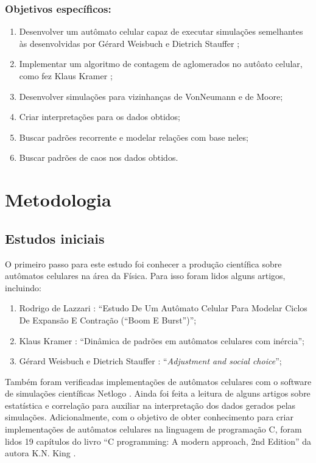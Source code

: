 \documentclass[
	12pt,				%
	openright,			%
	twoside,			%
	a4paper,			%
	english,			%
	french,				%
	spanish,			%
	brazil				%
	]{abntex2}
\begin{document}
\subsection*{Objetivos específicos:}
\begin{enumerate}
  \item Desenvolver um autômato celular capaz de executar simulações semelhantes às desenvolvidas por Gérard Weisbuch e Dietrich Stauffer \cite{stauffer};
  \item Implementar um algoritmo de contagem de aglomerados no autôato celular, como fez Klaus Kramer \cite{klaus};
  \item Desenvolver simulações para vizinhanças de VonNeumann e de Moore;
  \item Criar interpretações para os dados obtidos;
  \item Buscar padrões recorrente e modelar relações com base neles;
  \item Buscar padrões de caos nos dados obtidos.
\end{enumerate}


\chapter{Metodologia}

\section{Estudos iniciais}

O primeiro passo para este estudo foi conhecer a produção científica sobre autômatos celulares na área da Física. Para isso foram lidos alguns artigos, incluindo:
\begin{enumerate}
    \item Rodrigo de Lazzari \cite{lazzari}: “Estudo De Um Autômato Celular Para Modelar Ciclos De Expansão E Contração (“Boom E Burst”)”;
    \item Klaus Kramer \cite{klaus}: “Dinâmica de padrões em autômatos celulares com inércia”;
    \item Gérard Weisbuch e Dietrich Stauffer \cite{stauffer}: “\textit{Adjustment and social choice}”;
\end{enumerate}
Também foram verificadas implementações de autômatos celulares  com o software de simulações científicas Netlogo \cite{netlogo}. Ainda foi feita a leitura de alguns artigos sobre estatística \cite{statistics} e correlação para auxiliar na interpretação dos dados gerados pelas simulações. Adicionalmente, com o objetivo de obter conhecimento para criar implementações de autômatos celulares na linguagem de programação C, foram  lidos 19 capítulos do livro “C programming: A modern approach, 2nd Edition” da autora K.N. King \cite{king}.
    
\end{document}
